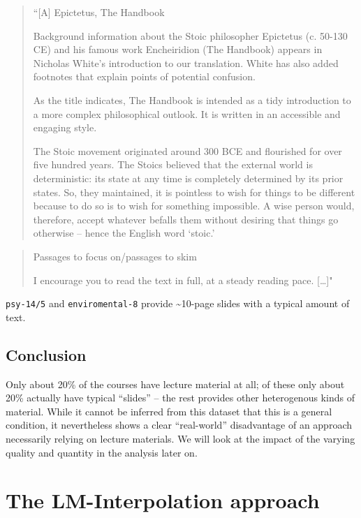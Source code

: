 \documentclass[]{article}
\begin{document}
\begin{quote}
``{[}A{]} Epictetus, The Handbook

Background information about the Stoic philosopher Epictetus (c. 50-130
CE) and his famous work Encheiridion (The Handbook) appears in Nicholas
White's introduction to our translation. White has also added footnotes
that explain points of potential confusion.

As the title indicates, The Handbook is intended as a tidy introduction
to a more complex philosophical outlook. It is written in an accessible
and engaging style.

The Stoic movement originated around 300 BCE and flourished for over
five hundred years. The Stoics believed that the external world is
deterministic: its state at any time is completely determined by its
prior states. So, they maintained, it is pointless to wish for things to
be different because to do so is to wish for something impossible. A
wise person would, therefore, accept whatever befalls them without
desiring that things go otherwise -- hence the English word `stoic.'
\end{quote}

\begin{quote}
Passages to focus on/passages to skim

I encourage you to read the text in full, at a steady reading pace.
{[}\ldots{}{]}"
\end{quote}

\texttt{psy-14/5} and \texttt{enviromental-8} provide
\textasciitilde{}10-page slides with a typical amount of text.

\subsection{Conclusion}\label{conclusion-1}

Only about 20\% of the courses have lecture material at all; of these
only about 20\% actually have typical ``slides'' -- the rest provides
other heterogenous kinds of material. While it cannot be inferred from
this dataset that this is a general condition, it nevertheless shows a
clear ``real-world'' disadvantage of an approach necessarily relying on
lecture materials. We will look at the impact of the varying quality and
quantity in the analysis later on.

\section{The LM-Interpolation
approach}\label{the-lm-interpolation-approach}
\end{document}
